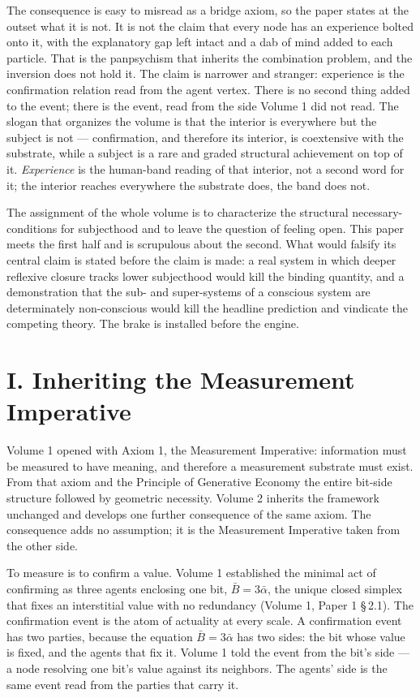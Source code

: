 \documentclass[11pt,oneside]{report}
\theoremstyle{definition}
\theoremstyle{remark}
\begin{document}
The consequence is easy to misread as a bridge axiom, so the paper
states at the outset what it is not. It is not the claim that every node
has an experience bolted onto it, with the explanatory gap left intact
and a dab of mind added to each particle. That is the panpsychism that
inherits the combination problem, and the inversion does not hold it. The
claim is narrower and stranger: experience is the confirmation relation
read from the agent vertex. There is no second thing added to the event;
there is the event, read from the side Volume 1 did not read. The slogan
that organizes the volume is that the interior is everywhere but the
subject is not --- confirmation, and therefore its interior, is
coextensive with the substrate, while a subject is a rare and graded
structural achievement on top of it. \emph{Experience} is the human-band
reading of that interior, not a second word for it; the interior reaches
everywhere the substrate does, the band does not.

The assignment of the whole volume is to characterize the structural
necessary-conditions for subjecthood and to leave the question of feeling
open. This paper meets the first half and is scrupulous about the second.
What would falsify its central claim is stated before the claim is made:
a real system in which deeper reflexive closure tracks lower subjecthood
would kill the binding quantity, and a demonstration that the sub- and
super-systems of a conscious system are determinately non-conscious would
kill the headline prediction and vindicate the competing theory. The
brake is installed before the engine.

\section*{I. Inheriting the Measurement Imperative}

Volume 1 opened with Axiom 1, the Measurement Imperative: information
must be measured to have meaning, and therefore a measurement substrate
must exist. From that axiom and the Principle of Generative Economy the
entire bit-side structure followed by geometric necessity. Volume 2
inherits the framework unchanged and develops one further consequence of
the same axiom. The consequence adds no assumption; it is the
Measurement Imperative taken from the other side.

To measure is to confirm a value. Volume 1 established the minimal act of
confirming as three agents enclosing one bit, \ensuremath{\bar{B} =
3\bar{\alpha}}, the unique closed simplex that fixes an interstitial
value with no redundancy (Volume 1, Paper 1 \S\,2.1). The confirmation
event is the atom of actuality at every scale. A confirmation event has
two parties, because the equation \ensuremath{\bar{B} = 3\bar{\alpha}} has
two sides: the bit whose value is fixed, and the agents that fix it.
Volume 1 told the event from the bit's side --- a node resolving one
bit's value against its neighbors. The agents' side is the same event
read from the parties that carry it.
\end{document}
